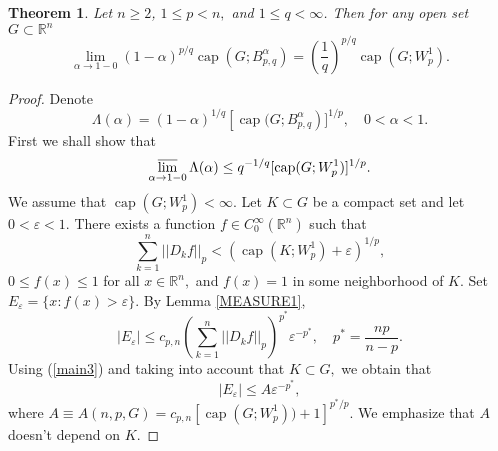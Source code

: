 \documentclass[12pt,twoside,reqno]{amsart}
\numberwithin{equation}{section}
\newtheorem{teo}{Theorem}[section]
\theoremstyle{definition}
\numberwithin{equation}{section}
\begin{document}
\begin{teo}\label{MAIN} Let $n\ge 2$,  $1\le p<n,$ and $1\le
q<\infty$. Then for any open set $G\subset {\mathbb{R}}^n$
\begin{equation}\label{main1}
\lim_{{\alpha}\to 1-0}(1-{\alpha})^{p/q} {\operatorname{cap}}\left(G; B_{p,q}^{\alpha}\right)=
\left(\frac1q\right)^{p/q}{\operatorname{cap}} (G; W_p^1).
\end{equation}
\end{teo}
\begin{proof} Denote
\begin{equation}\label{main0}
\Lambda({\alpha})=(1-{\alpha})^{1/q}\left[{\operatorname{cap}}(G; B_{p,q}^{\alpha}\right)]^{1/p},\quad 0<{\alpha}<1.
\end{equation}
First we shall show that
\begin{equation}\label{main2}
\varlimsup_{{\alpha}\to 1-0}\Lambda({\alpha})\le q^{-1/q}[{\operatorname{cap}}(G;W_p^1)]^{1/p}.
\end{equation}
We assume that ${\operatorname{cap}}(G;W_p^1)<\infty.$ Let $K\subset G$ be a
compact set and let $0<{\varepsilon}<1.$ There exists a function $f\in
C_0^\infty({\mathbb{R}}^n)$ such that
\begin{equation}\label{main3}
\sum_{k=1}^n||D_k f||_p < ({\operatorname{cap}}(K;W_p^1)+{\varepsilon})^{1/p},
\end{equation}
$0\le f(x)\le 1$ for all $x\in {\mathbb{R}}^n,$ and $f(x)=1$ in some
neighborhood of $K.$ Set $E_{\varepsilon}=\{x:f(x)>{\varepsilon}\}.$ By Lemma
\ref{MEASURE1},
$$
|E_{\varepsilon}|\le c_{p,n}\left(\sum_{k=1}^n||D_k f||_p\right)^{p^*}{\varepsilon}^{-p^*}, \quad p^*=\frac{np}{n-p}.
$$
Using (\ref{main3}) and taking into account that $K\subset G,$ we
obtain that
\begin{equation}\label{main4}
|E_{\varepsilon}|\le A {\varepsilon}^{-p^*},
\end{equation}
where $A\equiv A(n,p,G)=c_{p,n}[{\operatorname{cap}}(G;W_p^1))+1]^{p^*/p}$. We emphasize that $A$
doesn't depend on $K.$


\end{proof}
\end{document}
